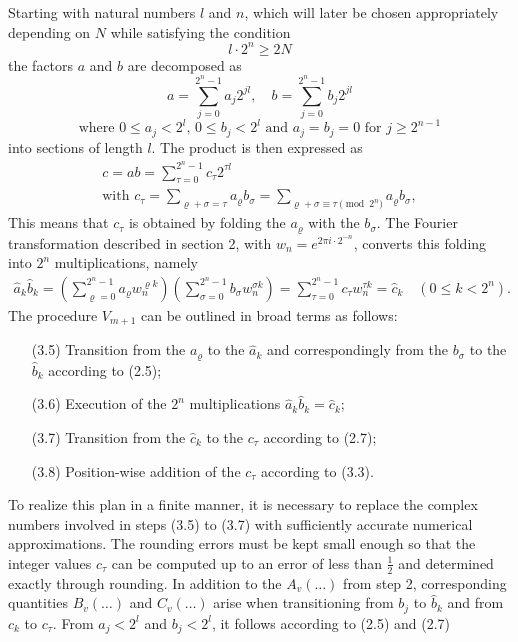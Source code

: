 \documentclass{article}
\begin{document}
Starting with natural numbers $l$ and $n$, which will later be chosen appropriately depending on $N$ while satisfying the condition
\[
\tag{3.1}
l \cdot 2^n \ge 2N
\]
the factors $a$ and $b$ are decomposed as
\[
\tag{3.2}
a = \sum_{j = 0}^{2^n - 1} a_j 2^{jl}, \quad b = \sum_{j = 0}^{2^n - 1} b_j 2^{jl}
\]\[
\text{where $0 \le a_j < 2^l$, $0 \le b_j < 2^l$ and $a_j = b_j = 0$ for $j \ge 2^{n - 1}$}
\]
into sections of length $l$. The product is then expressed as
\[
\tag{3.3}
\begin{gathered}
c = ab = \sum_{\tau = 0}^{2^n - 1} c_\tau 2^{\tau l} \\
\text{with }c_\tau = \sum_{\varrho + \sigma = \tau} a_\varrho b_\sigma = \sum_{\varrho + \sigma \equiv \tau \pmod{2^n}} a_\varrho b_\sigma,
\end{gathered}
\]
This means that $c_\tau$ is obtained by folding the $a_\varrho$ with the $b_\sigma$. The Fourier transformation described in section 2, with $w_n = e^{2 \pi i \cdot 2^{-n}}$, converts this folding into $2^n$ multiplications, namely
\[
\tag{3.4}
\begin{gathered}
\hat{a}_k \hat{b}_k = \left(\sum_{\varrho = 0}^{2^n - 1} a_\varrho w_n^{\varrho k}\right) \left(\sum_{\sigma = 0}^{2^n - 1} b_\sigma w_n^{\sigma k}\right) = \sum_{\tau = 0}^{2^n - 1} c_\tau w_n^{\tau k} = \hat{c}_k \quad (0 \le k < 2^n).
\end{gathered}
\]
The procedure $V_{m+1}$ can be outlined in broad terms as follows:
\begin{enumerate}[labelindent=0pt=0pt]
\item[(3.5)] Transition from the $a_\varrho$ to the $\hat{a}_k$ and correspondingly from the $b_\sigma$ to the $\hat{b}_k$ according to (2.5);
\item[(3.6)] Execution of the $2^n$ multiplications $\hat{a}_k \hat{b}_k = \hat{c}_k$;
\item[(3.7)] Transition from the $\hat{c}_k$ to the $c_\tau$ according to (2.7);
\item[(3.8)] Position-wise addition of the $c_\tau$ according to (3.3).
\end{enumerate}
To realize this plan in a finite manner, it is necessary to replace the complex numbers involved in steps (3.5) to (3.7) with sufficiently accurate numerical approximations. The rounding errors must be kept small enough so that the integer values $c_\tau$ can be computed up to an error of less than $\frac{1}{2}$ and determined exactly through rounding. In addition to the $A_v(\ldots)$ from step 2, corresponding quantities $B_v(\ldots)$ and $C_v(\ldots)$ arise when transitioning from $b_j$ to $\hat{b}_k$ and from $c_k$ to $c_\tau$. From $a_j < 2^l$ and $b_j < 2^l$, it follows according to (2.5) and (2.7)
\end{document}
